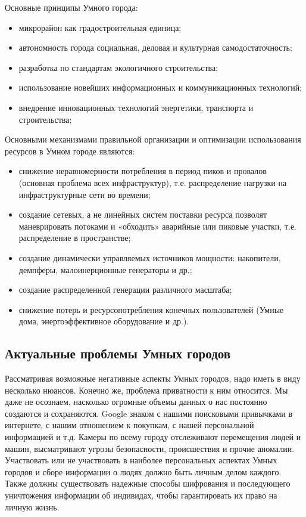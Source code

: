Основные принципы Умного города: 
\begin{itemize}
	\item микрорайон как градостроительная единица; 
	\item автономность города социальная, деловая и  культурная самодостаточность;
	\item разработка по стандартам экологичного строительства; 
	\item использование новейших информационных и коммуникационных технологий;
	\item внедрение инновационных технологий энергетики, транспорта и строительства;
\end{itemize}

Основными механизмами правильной организации и  оптимизации использования ресурсов в Умном городе являются: 
\begin{itemize}
	\item снижение неравномерности потребления в период пиков и провалов (основная проблема всех инфраструктур), т.е. распределение нагрузки на инфраструктурные сети во времени; 
	\item создание сетевых, а не линейных систем поставки ресурса позволят маневрировать потоками и «обходить» аварийные или пиковые участки, т.е. распределение в пространстве; 
	\item создание динамически управляемых источников мощности: накопители, демпферы, малоинерционные генераторы и др.; 
	\item создание распределенной генерации различного масштаба;
	\item снижение потерь и ресурсопотребления конечных пользователей (Умные дома, энергоэффективное оборудование и др.).
\end{itemize}

\subsection{Актуальные проблемы Умных городов}
Рассматривая возможные негативные аспекты Умных городов, надо иметь в виду несколько нюансов.\cite{Almanah} Конечно же, проблема приватности к ним относится. Мы даже не осознаем, насколько огромные объемы данных о нас постоянно создаются и сохраняются. Google знаком с нашими поисковыми привычками в интернете, с нашим отношением к покупкам, с нашей персональной информацией и т.д. Камеры по всему городу отслеживают перемещения людей и машин, высматривают угрозы безопасности, происшествия и прочие аномалии. Участвовать или не участвовать в наиболее персональных аспектах Умных городов и сборе информации о людях должно быть личным делом каждого. Также должны существовать надежные способы шифрования и последующего уничтожения информации об индивидах, чтобы гарантировать их право на личную жизнь.

